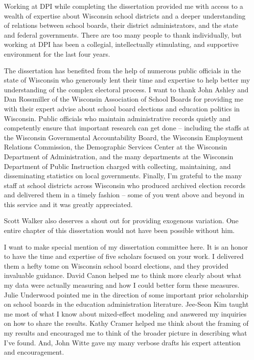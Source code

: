Working at DPI while completing the dissertation provided me with access to a 
wealth of expertise about Wisconsin school districts and a deeper understanding 
of relations between school boards, their district administrators, and the state 
and federal governments. There are too many people to thank individually, but 
working at DPI has been a collegial, intellectually stimulating, and supportive 
environment for the last four years. 

The dissertation has benefited from the help of numerous public officials in the 
state of Wisconsin who generously lent their time and expertise to help better 
my understanding of the complex electoral process. I want to thank John Ashley 
and Dan Rossmiller of the Wisconsin Association of School Boards for providing 
me with their expert advise about school board elections and education politics 
in Wisconsin. Public officials who maintain administrative records quietly and 
competently ensure that important research can get done -- including the staffs 
at the Wisconsin Governmental Accountability Board, the Wisconsin Employment 
Relations Commission, the Demographic Services Center at the Wisconsin 
Department of Administration, and the many departments at the Wisconsin 
Department of Public Instruction charged with collecting, maintaining, and 
disseminating statistics on local governments. Finally, I'm grateful to the 
many staff at school districts across Wisconsin who produced archived election 
records and delivered them in a timely fashion -- some of you went above and 
beyond in this service and it was greatly appreciated. 

Scott Walker also deserves a shout out for providing exogenous variation. One 
entire chapter of this dissertation would not have been possible without him. 

I want to make special mention of my dissertation committee here. It is an honor 
to have the time and expertise of five scholars focused on your work. I delivered 
them a hefty tome on Wisconsin school board elections, and they provided invaluable 
guidance. David Canon helped me to think more clearly about what my data were 
actually measuring and how I could better form these measures. Julie Underwood 
pointed me in the direction of some important prior scholarship on school boards 
in the education administration literature. Jee-Seon Kim taught me most of what 
I know about mixed-effect modeling and answered my inquiries on how to share 
the results. Kathy Cramer helped me think about the framing of my results and 
encouraged me to think of the broader picture in describing what I've found. 
And, John Witte gave my many verbose drafts his expert attention and encouragement. 

